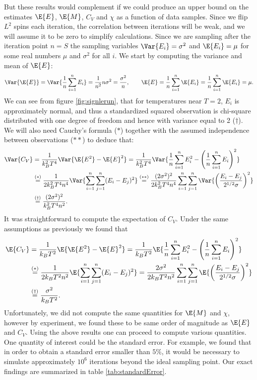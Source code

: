 \documentclass[11pt,english,a4paper]{article}
\begin{document}
But these results would complement if we could produce an upper bound on the estimates $\E{E}$, $\E{M}$, $C_V$ and $\chi$ as a function of data samples. Since we flip $L^2$ spins each iteration, the correlation between iterations will be weak, and we will assume it to be zero to simplify calculations. Since we are sampling after the iteration point $n=S$ the sampling variables $\Var{E_i} = \sigma^2 $ and $\E{E_i} = \mu $ for some real numbers $\mu$ and $\sigma^2$ for all $i$. We start by computing the variance and mean of $\E{E}$:
\[
\Var{\E{E}} = \Var{ \frac{1}{n} \sum_{  i=1}^n E_i } = \frac{1}{n^2} n \sigma^2 = \frac{\sigma^2}{n}, \qquad \E{E} = \frac{1}{n}  \sum_{  i=1}^n\E{ E_i} = \frac{1}{n} \sum_{  i=1}^n \E{ E_i} = \mu.
\]
We can see from figure \ref{fig:signlerun}, that for temperatures near $T=2$, $E_i$ is approximately normal, and thus a standardized squared observation is chi-square distributed with one degree of freedom and hence with variance equal to 2 ($\dagger$). We will also need Cauchy's formula ($*$) together with the assumed independence between observations ($**$) to deduce that:
\begin{align*}
\Var{C_V} &= \frac{1}{k_B^2T^4}\Var{ \E{E^2} - \E{E}^2 } = \frac{1}{k_B^2T^4}\Var{  \frac{1}{n} \sum_{  i=1}^n E_i^2  -  \left(\frac{1}{n} \sum_{  i=1}^n E_i\right)^2  } \\
&\stackrel{(*)}{=} \frac{1}{2k_B^2T^4 n^4} \Var{ \sum_{  i=1}^n \sum_{  j=1}^n (E_i - E_j)^2 } \stackrel{(**)}{=} \frac{(2 \sigma^2)^2}{2k_B^2T^4 n^4}  \sum_{  i=1}^n \sum_{  j=1}^n \Var{ \left(\frac{E_i - E_j}{2^{1/2} \sigma} \right)^2 } \\
&\stackrel{(\dagger)}{=} \frac{(2 \sigma^2)^2}{k_B^2T^4 n^2}.
\end{align*}
It was straightforward to compute the expectation of $C_V$. Under the same assumptions as previously we found that
\begin{align*}
\E{C_V} &= \frac{1}{k_B T^2}\E{ \E{E^2} - \E{E}^2 } = \frac{1}{k_B T^2}\E{  \frac{1}{n} \sum_{  i=1}^n E_i^2  -  \left(\frac{1}{n} \sum_{  i=1}^n E_i\right)^2  } \\
&\stackrel{(*)}{=} \frac{1}{2k_BT^2 n^2} \E{ \sum_{  i=1}^n \sum_{  j=1}^n (E_i - E_j)^2 } = \frac{2 \sigma^2}{2k_BT^2 n^2}  \sum_{  i=1}^n \sum_{  j=1}^n \E{ \left(\frac{E_i - E_j}{2^{1/2} \sigma} \right)^2 } \\
&\stackrel{(\dagger)}{=} \frac{\sigma^2}{k_BT^2}.
\end{align*}
Unfortunately, we did not compute the same quantities for $\E{M}$ and $\chi$, however by experiment, we found these to be same order of magnitude as $\E{E}$ and $C_V$. Using the above results one can proceed to compute various quantities. One quantity of interest could be the standard error. For example, we found that in order to obtain a standard error smaller than $5\%$, it would be necessary to simulate approximately $10^6$ iterations beyond the ideal sampling point. Our exact findings are summarized in table \ref{tab:standardError}.
\end{document}
